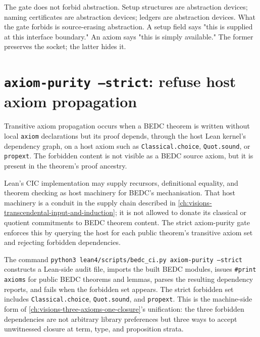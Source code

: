 \begin{remark}
\label{rem:audit-gates-not-anti-abstraction}
The gate does not forbid abstraction. Setup structures are abstraction devices; naming certificates are abstraction devices; ledgers are abstraction devices. What the gate forbids is source-erasing abstraction. A setup field says "this is supplied at this interface boundary." An axiom says "this is simply available." The former preserves the socket; the latter hides it.
\end{remark}

\section{\texttt{axiom-purity --strict}: refuse host axiom propagation}
\label{sec:audit-gates-axiom-purity}

\begin{definition}
\label{def:audit-gates-transitive-axiom-propagation}
Transitive axiom propagation occurs when a BEDC theorem is written without local \texttt{axiom} declarations but its proof depends, through the host Lean kernel's dependency graph, on a host axiom such as \texttt{Classical.choice}, \texttt{Quot.sound}, or \texttt{propext}. The forbidden content is not visible as a BEDC source axiom, but it is present in the theorem's proof ancestry.
\end{definition}

\begin{principle}
\label{prin:audit-gates-host-conduit}
Lean's CIC implementation may supply recursors, definitional equality, and theorem checking as host machinery for BEDC's mechanisation. That host machinery is a conduit in the supply chain described in \autoref{ch:visions-transcendental-input-and-induction}; it is not allowed to donate its classical or quotient commitments to BEDC theorem content. The strict axiom-purity gate enforces this by querying the host for each public theorem's transitive axiom set and rejecting forbidden dependencies.
\end{principle}

The command \texttt{python3 lean4/scripts/bedc\_ci.py axiom-purity --strict} constructs a Lean-side audit file, imports the built BEDC modules, issues \texttt{\#print axioms} for public BEDC theorems and lemmas, parses the resulting dependency reports, and fails when the forbidden set appears. The strict forbidden set includes \texttt{Classical.choice}, \texttt{Quot.sound}, and \texttt{propext}. This is the machine-side form of \autoref{ch:visions-three-axioms-one-closure}'s unification: the three forbidden dependencies are not arbitrary library preferences but three ways to accept unwitnessed closure at term, type, and proposition strata.

